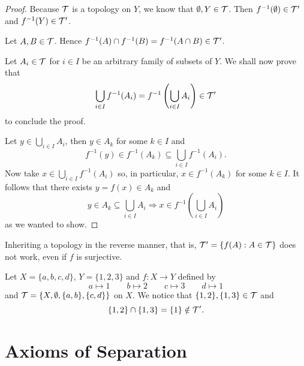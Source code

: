 \documentclass[../../main/main.tex]{subfiles}
\begin{document}
\begin{proof}
  Because $\mathcal{T}$ is a topology on $Y$, we know that $\emptyset, Y \in \mathcal{T}$. Then $f^{-1}(\emptyset) \in \mathcal{T}'$ and $f^{-1}(Y) \in \mathcal{T}'$.

  Let $A, B \in \mathcal{T}$. Hence $f^{-1}(A) \cap f^{-1}(B) = f^{-1} ( A \cap B ) \in \mathcal{T}'$.

  Let $A_{i} \in \mathcal{T}$ for $i \in I$ be an arbitrary family of subsets of $Y$. We shall now prove that
  \begin{equation*}
    \bigcup_{i \in I} f^{-1}(A_{i}) = f^{-1} \left( \bigcup_{i \in I} A_{i} \right) \in \mathcal{T}'
  \end{equation*}
  to conclude the proof.

  Let $y \in \bigcup_{i \in I} A_{i}$, then $y \in A_{k}$ for some $k \in I$ and
  \begin{equation*}
    f^{-1}(y) \in f^{-1}(A_{k}) \subseteq \bigcup_{i \in I} f^{-1} \left( A_{i} \right).
  \end{equation*}
  Now take $x \in \bigcup_{i \in I} f^{-1}(A_{i})$ so, in particular, $x \in f^{-1}(A_{k})$ for some $k \in I$. It follows that there exists $y = f(x) \in A_{k}$ and
  \begin{equation*}
    y \in A_{k} \subseteq \bigcup_{i \in I} A_{i} \Rightarrow x \in f^{-1} \left( \bigcup_{i \in I} A_{i} \right)
  \end{equation*}
  as we wanted to show.
\end{proof}

\begin{remark}
  Inheriting a topology in the reverse manner, that is, $\mathcal{T}' = \{f(A) : A \in \mathcal{T}\}$ does not work, even if $f$ is surjective.
\end{remark}

\begin{example}
  Let $X = \{a, b, c, d\}$, $Y = \{1, 2, 3\}$ and $f: X \rightarrow Y$ defined by
  \begin{equation*}
    a \mapsto 1 \quad \quad b \mapsto 2 \quad \quad c \mapsto 3 \quad \quad d \mapsto 1
  \end{equation*}
  and $\mathcal{T} = \{ X, \emptyset, \{a, b\}, \{c, d\} \}$ on $X$. We notice that $\{1, 2\}, \{1, 3\} \in \mathcal{T}$ and
  \begin{equation*}
    \{1, 2\} \cap \{1, 3\} = \{1\} \notin \mathcal{T}'.
  \end{equation*}
\end{example}

\section{Axioms of Separation}
\label{sec:axioms-of-separation}
\end{document}
